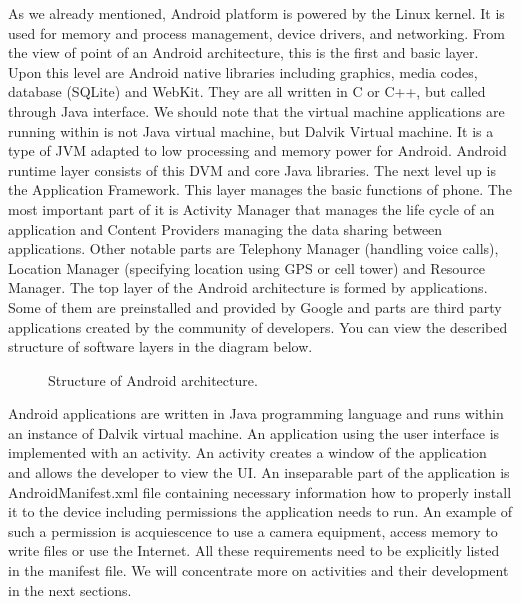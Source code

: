 As we already mentioned, Android platform is powered by the Linux kernel. 
It is used for memory and process management, device drivers, and networking.
From the view of point of an Android architecture, this is the first and basic layer.
Upon this level are Android native libraries including graphics, media codes, database (SQLite) and WebKit.
They are all written in C or C++, but called through Java interface.
We should note that the virtual machine applications are running within is not Java virtual machine, but Dalvik Virtual machine.
It is a type of JVM adapted to low processing and memory power for Android.
Android runtime layer consists of this DVM and core Java libraries.
The next level up is the Application Framework.
This layer manages the basic functions of phone. 
The most important part of it is Activity Manager that manages the life cycle of an application and Content Providers managing the data sharing between applications.
Other notable parts are Telephony Manager (handling voice calls), Location Manager (specifying location using GPS or cell tower) and Resource Manager.
The top layer of the Android architecture is formed by applications.
Some of them are preinstalled and provided by Google and parts are third party applications created by the community of developers.
You can view the described structure of software layers in the diagram below.

\begin{figure}[h!]
    \caption{Structure of Android architecture.}
\end{figure}


Android applications are written in Java programming language and runs within an instance of Dalvik virtual machine.
An application using the user interface is implemented with an activity. 
An activity creates a window of the application and allows the developer to view the UI.
An inseparable part of the application is AndroidManifest\@.xml file containing necessary information how to properly install it to the device 
including permissions the application needs to run. 
An example of such a permission is acquiescence to use a camera equipment, access memory to write files or use the Internet.
All these requirements need to be explicitly listed in the manifest file.
We will concentrate more on activities and their development in the next sections.

